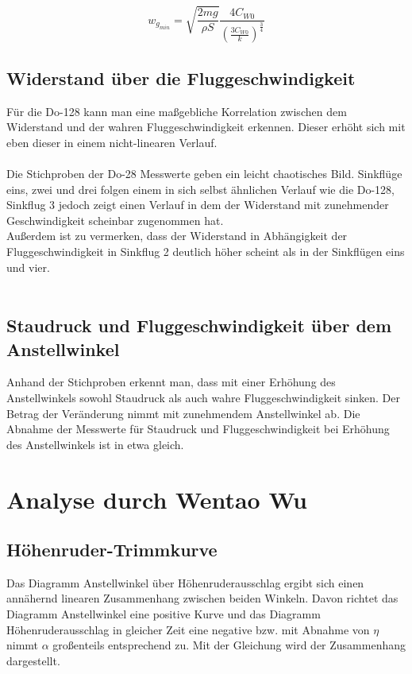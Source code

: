 \begin{equation*}
w_{g_{min}} = \sqrt{\frac{2mg}{\rho S}} \frac{4C_{W0}}{\left( \frac{3C_{W0}}{k}\right)^{\frac{3}{4}}}
\end{equation*}

\vspace{10mm}
\subsection{Widerstand über die Fluggeschwindigkeit}
Für die Do-128 kann man eine maßgebliche Korrelation zwischen dem Widerstand und der wahren Fluggeschwindigkeit erkennen. Dieser erhöht sich mit eben dieser in einem  nicht-linearen Verlauf.\\\\
Die Stichproben der Do-28 Messwerte geben ein leicht chaotisches Bild. Sinkflüge eins, zwei und drei folgen einem in sich selbst ähnlichen Verlauf wie die Do-128, Sinkflug 3 jedoch zeigt einen Verlauf in dem der Widerstand mit zunehmender Geschwindigkeit scheinbar zugenommen hat.\\
Außerdem ist zu vermerken, dass der Widerstand in Abhängigkeit der Fluggeschwindigkeit in Sinkflug 2 deutlich höher scheint als in der Sinkflügen eins und vier.\\\\

\subsection{Staudruck und Fluggeschwindigkeit über dem Anstellwinkel}
Anhand der Stichproben erkennt man, dass mit einer Erhöhung des Anstellwinkels sowohl Staudruck als auch wahre Fluggeschwindigkeit sinken. Der Betrag der Veränderung nimmt mit zunehmendem Anstellwinkel ab. Die Abnahme der Messwerte für Staudruck und Fluggeschwindigkeit bei Erhöhung des Anstellwinkels ist in etwa gleich.
\vspace{10mm}

\section{Analyse durch Wentao Wu}
\subsection{Höhenruder-Trimmkurve}
Das Diagramm Anstellwinkel über Höhenruderausschlag ergibt sich einen annähernd linearen Zusammenhang zwischen beiden Winkeln. Davon richtet das Diagramm Anstellwinkel eine positive Kurve und das Diagramm Höhenruderausschlag in gleicher Zeit eine negative bzw. mit Abnahme von $\eta$ nimmt $\alpha$ großenteils entsprechend zu. Mit der Gleichung wird der Zusammenhang dargestellt.

